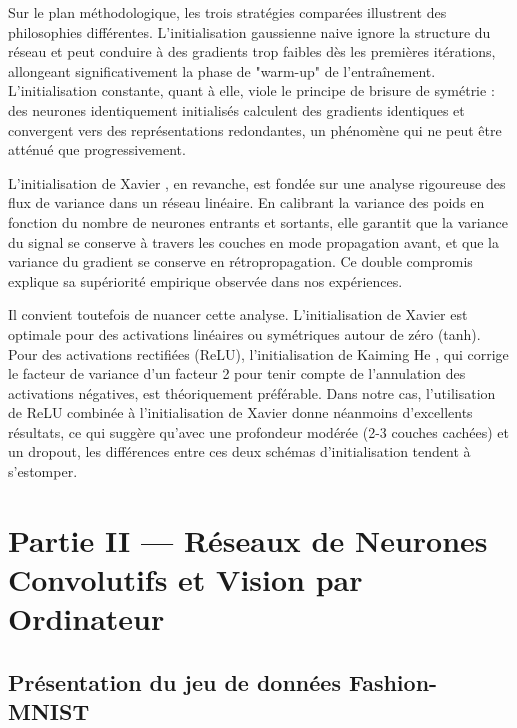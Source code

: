 \documentclass[11pt,a4paper]{article}
\begin{document}
Sur le plan méthodologique, les trois stratégies comparées illustrent des philosophies
différentes. L'initialisation gaussienne naive ignore la structure du réseau et peut
conduire à des gradients trop faibles dès les premières itérations, allongeant
significativement la phase de "warm-up" de l'entraînement. L'initialisation constante,
quant à elle, viole le principe de brisure de symétrie : des neurones identiquement
initialisés calculent des gradients identiques et convergent vers des représentations
redondantes, un phénomène qui ne peut être atténué que progressivement.

L'initialisation de Xavier \cite{glorot2010understanding}, en revanche, est fondée sur
une analyse rigoureuse des flux de variance dans un réseau linéaire. En calibrant la
variance des poids en fonction du nombre de neurones entrants et sortants, elle garantit
que la variance du signal se conserve à travers les couches en mode propagation avant,
et que la variance du gradient se conserve en rétropropagation. Ce double compromis
explique sa supériorité empirique observée dans nos expériences.

Il convient toutefois de nuancer cette analyse. L'initialisation de Xavier est optimale
pour des activations linéaires ou symétriques autour de zéro (tanh). Pour des activations
rectifiées (ReLU), l'initialisation de Kaiming He \cite{he2015delving}, qui corrige
le facteur de variance d'un facteur 2 pour tenir compte de l'annulation des activations
négatives, est théoriquement préférable. Dans notre cas, l'utilisation de ReLU combinée
à l'initialisation de Xavier donne néanmoins d'excellents résultats, ce qui suggère
qu'avec une profondeur modérée (2-3 couches cachées) et un dropout, les différences
entre ces deux schémas d'initialisation tendent à s'estomper.

\section{Partie II — Réseaux de Neurones Convolutifs et Vision par Ordinateur}

\subsection{Présentation du jeu de données Fashion-MNIST}
\end{document}
